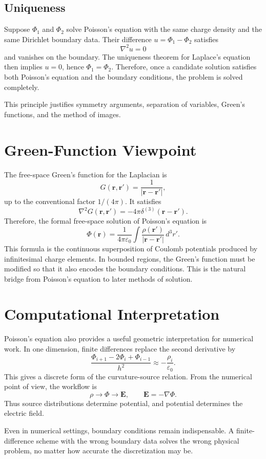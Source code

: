 \documentclass[12pt]{article}
\begin{document}
\subsection{Uniqueness}
Suppose $\Phi_1$ and $\Phi_2$ solve Poisson's equation with the same charge density and the same Dirichlet boundary data. Their difference $u=\Phi_1-\Phi_2$ satisfies
\[
\nabla^2 u=0
\]
and vanishes on the boundary. The uniqueness theorem for Laplace's equation then implies $u=0$, hence $\Phi_1=\Phi_2$. Therefore, once a candidate solution satisfies both Poisson's equation and the boundary conditions, the problem is solved completely.

This principle justifies symmetry arguments, separation of variables, Green's functions, and the method of images.

\section{Green-Function Viewpoint}
The free-space Green's function for the Laplacian is
\[
G(\mathbf r,\mathbf r')=\frac{1}{|\mathbf r-\mathbf r'|},
\]
up to the conventional factor $1/(4\pi)$. It satisfies
\[
\nabla^2 G(\mathbf r,\mathbf r')=-4\pi\delta^{(3)}(\mathbf r-\mathbf r').
\]
Therefore, the formal free-space solution of Poisson's equation is
\[
\Phi(\mathbf r)
=
\frac{1}{4\pi\varepsilon_0}
\int \frac{\rho(\mathbf r')}{|\mathbf r-\mathbf r'|}\,d^3r'.
\]
This formula is the continuous superposition of Coulomb potentials produced by infinitesimal charge elements. In bounded regions, the Green's function must be modified so that it also encodes the boundary conditions. This is the natural bridge from Poisson's equation to later methods of solution.

\section{Computational Interpretation}
Poisson's equation also provides a useful geometric interpretation for numerical work. In one dimension, finite differences replace the second derivative by
\[
\frac{\Phi_{i+1}-2\Phi_i+\Phi_{i-1}}{h^2}
\approx
-\frac{\rho_i}{\varepsilon_0}.
\]
This gives a discrete form of the curvature-source relation. From the numerical point of view, the workflow is
\[
\rho \longrightarrow \Phi \longrightarrow \mathbf E,
\qquad
\mathbf E=-\nabla\Phi.
\]
Thus source distributions determine potential, and potential determines the electric field.

Even in numerical settings, boundary conditions remain indispensable. A finite-difference scheme with the wrong boundary data solves the wrong physical problem, no matter how accurate the discretization may be.
\end{document}
